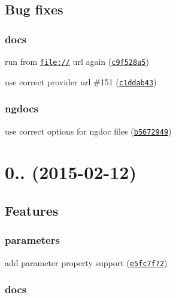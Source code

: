 \subsection*{Bug fixes}

\subsubsection*{docs}


\begin{DoxyItemize}
\item run from \href{file://}{\tt file\+://} url again (\href{https://github.com/m7r/grunt-ngdocs/commit/c9f528a5}{\tt c9f528a5})
\item use correct provider url \#151 (\href{https://github.com/m7r/grunt-ngdocs/commit/c1ddab43}{\tt c1ddab43})
\end{DoxyItemize}

\subsubsection*{ngdocs}


\begin{DoxyItemize}
\item use correct options for ngdoc files (\href{https://github.com/m7r/grunt-ngdocs/commit/b5672949}{\tt b5672949})
\end{DoxyItemize}

\section*{0.. (2015-\/02-\/12)}

\subsection*{Features}

\subsubsection*{parameters}


\begin{DoxyItemize}
\item add parameter property support (\href{https://github.com/m7r/grunt-ngdocs/commit/e5fc7f72}{\tt e5fc7f72})
\end{DoxyItemize}

\subsubsection*{docs}


